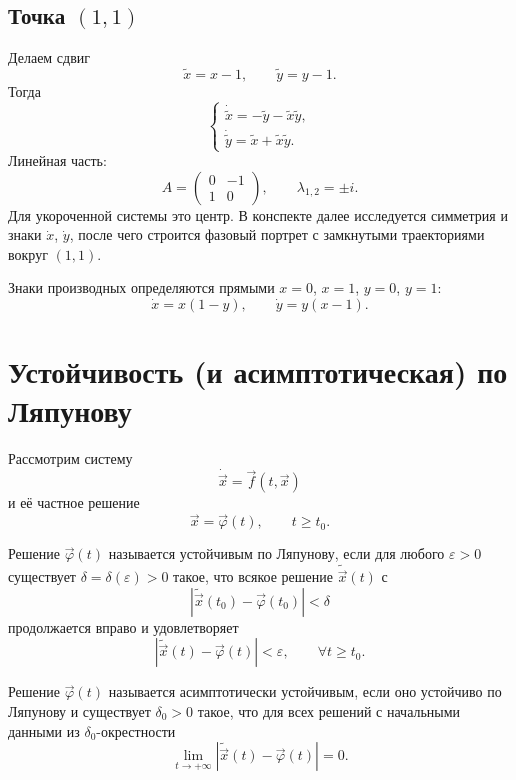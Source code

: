 \documentclass[12pt,a4paper]{article}
\numberwithin{equation}{section}
\newcommand{\vect}[1]{\vec{#1}}
\begin{document}
\subsection{Точка \texorpdfstring{$(1,1)$}{(1,1)}}
Делаем сдвиг
\[
\widetilde x=x-1,
\qquad
\widetilde y=y-1.
\]
Тогда
\[
\begin{cases}
\dot{\widetilde x}=-\widetilde y-\widetilde x\widetilde y,\\
\dot{\widetilde y}=\widetilde x+\widetilde x\widetilde y.
\end{cases}
\]
Линейная часть:
\[
A=\begin{pmatrix}0&-1\\1&0\end{pmatrix},
\qquad \lambda_{1,2}=\pm i.
\]
Для укороченной системы это центр. В конспекте далее исследуется симметрия и знаки $\dot x$, $\dot y$, после чего строится фазовый портрет с замкнутыми траекториями вокруг $(1,1)$.

Знаки производных определяются прямыми $x=0$, $x=1$, $y=0$, $y=1$:
\[
\dot x=x(1-y),
\qquad
\dot y=y(x-1).
\]


\section[Устойчивость по Ляпунову]{Устойчивость (и асимптотическая) по Ляпунову}

Рассмотрим систему
\[
\dot{\vect{x}}=\vect{f}(t,\vect{x})
\]
и её частное решение
\[
\vect{x}=\vect{\varphi}(t),
\qquad t\ge t_0.
\]

\begin{definitionHSE}
Решение $\vect{\varphi}(t)$ называется устойчивым по Ляпунову, если для любого $\varepsilon>0$ существует $\delta=\delta(\varepsilon)>0$ такое, что всякое решение $\widetilde{\vect{x}}(t)$ с
\[
|\widetilde{\vect{x}}(t_0)-\vect{\varphi}(t_0)|<\delta
\]
продолжается вправо и удовлетворяет
\[
|\widetilde{\vect{x}}(t)-\vect{\varphi}(t)|<\varepsilon,
\qquad \forall t\ge t_0.
\]
\end{definitionHSE}

\begin{definitionHSE}
Решение $\vect{\varphi}(t)$ называется асимптотически устойчивым, если оно устойчиво по Ляпунову и существует $\delta_0>0$ такое, что для всех решений с начальными данными из $\delta_0$-окрестности
\[
\lim_{t\to+\infty}
|\widetilde{\vect{x}}(t)-\vect{\varphi}(t)|=0.
\]
\end{definitionHSE}
\end{document}
